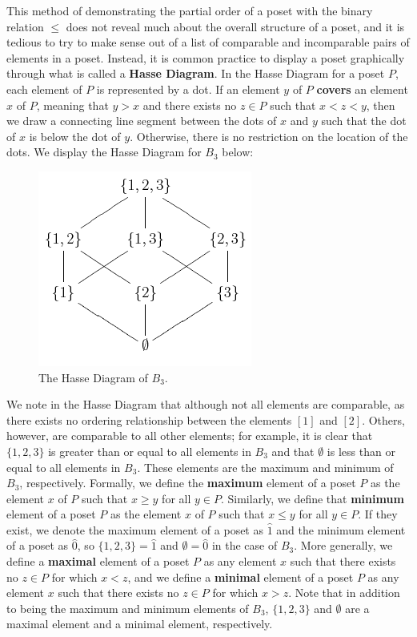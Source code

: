 \documentclass{article} %
\theoremstyle{definition}
\theoremstyle{plain}
\begin{document}
This method of demonstrating the partial order of a poset with the binary relation $\leq$ does not reveal much about the overall structure of a poset, and it is tedious to try to make sense out of a list of comparable and incomparable pairs of elements in a poset. Instead, it is common practice to display a poset graphically through what is called a \textbf{Hasse Diagram}. In the Hasse Diagram for a poset $P$, each element of $P$ is represented by a dot. If an element $y$ of $P$  \textbf{covers} an element $x$ of $P$, meaning that $y > x$ and there exists no $z \in P$ such that $x < z < y$, then we draw a connecting line segment between the dots of $x$ and $y$ such that the dot of $x$ is below the dot of $y$. Otherwise, there is no restriction on the location of the dots. We display the Hasse Diagram for $B_3$ below:

\begin{figure}[h!]
    \centering
        \includegraphics[scale=.75]{HasseDiagramB_3.png}
    \caption{The Hasse Diagram of $B_3$.}
\end{figure}

We note in the Hasse Diagram that although not all elements are comparable, as there exists no ordering relationship between the elements $[1]$ and $[2]$. Others, however, are comparable to all other elements; for example, it is clear that $\{1,2,3\}$ is greater than or equal to all elements in $B_3$ and that $\emptyset$ is less than or equal to all elements in $B_3$. These elements are the maximum and minimum of $B_3$, respectively. Formally, we define the \textbf{maximum} element of a poset $P$ as the element $x$ of $P$ such that $x \geq y$ for all $y \in P$. Similarly, we define that \textbf{minimum} element of a poset $P$ as the element $x$ of $P$ such that $x \leq y$ for all $y \in P$. If they exist, we denote the maximum element of a poset as $\hat{1}$ and the minimum element of a poset as $\hat{0}$, so $\{1,2,3\}=\hat{1}$ and $\emptyset=\hat{0}$ in the case of $B_3$. More generally, we define a \textbf{maximal} element of a poset $P$ as any element $x$ such that there exists no $z \in P$ for which $x < z$, and we define a \textbf{minimal} element of a poset $P$ as any element $x$ such that there exists no $z \in P$ for which $x > z$. Note that in addition to being the maximum and minimum elements of $B_3$, $\{1,2,3\}$ and $\emptyset$ are a maximal element and a minimal element, respectively.
\end{document}
